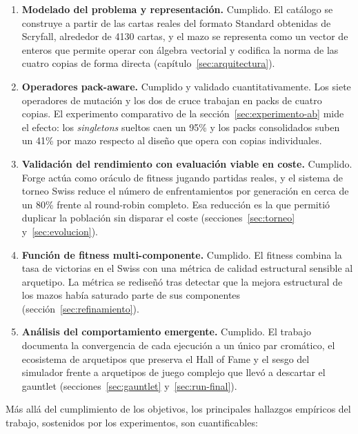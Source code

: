 \begin{enumerate}
    \item \textbf{Modelado del problema y representación.} Cumplido. El catálogo se construye a partir de las cartas reales del formato Standard obtenidas de Scryfall, alrededor de 4130 cartas, y el mazo se representa como un vector de enteros que permite operar con álgebra vectorial y codifica la norma de las cuatro copias de forma directa (capítulo~\ref{sec:arquitectura}).

    \item \textbf{Operadores pack-aware.} Cumplido y validado cuantitativamente. Los siete operadores de mutación y los dos de cruce trabajan en packs de cuatro copias. El experimento comparativo de la sección~\ref{sec:experimento-ab} mide el efecto: los \emph{singletons} sueltos caen un 95\% y los packs consolidados suben un 41\% por mazo respecto al diseño que opera con copias individuales.

    \item \textbf{Validación del rendimiento con evaluación viable en coste.} Cumplido. Forge actúa como oráculo de fitness jugando partidas reales, y el sistema de torneo Swiss reduce el número de enfrentamientos por generación en cerca de un 80\% frente al round-robin completo. Esa reducción es la que permitió duplicar la población sin disparar el coste (secciones~\ref{sec:torneo} y~\ref{sec:evolucion}).

    \item \textbf{Función de fitness multi-componente.} Cumplido. El fitness combina la tasa de victorias en el Swiss con una métrica de calidad estructural sensible al arquetipo. La métrica se rediseñó tras detectar que la mejora estructural de los mazos había saturado parte de sus componentes (sección~\ref{sec:refinamiento}).

    \item \textbf{Análisis del comportamiento emergente.} Cumplido. El trabajo documenta la convergencia de cada ejecución a un único par cromático, el ecosistema de arquetipos que preserva el Hall of Fame y el sesgo del simulador frente a arquetipos de juego complejo que llevó a descartar el gauntlet (secciones~\ref{sec:gauntlet} y~\ref{sec:run-final}).
\end{enumerate}

Más allá del cumplimiento de los objetivos, los principales hallazgos empíricos del trabajo, sostenidos por los experimentos, son cuantificables:

